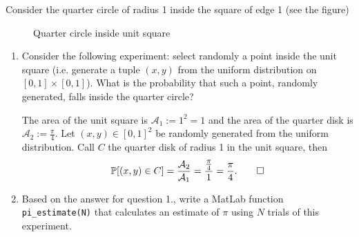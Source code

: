 \documentclass[fontsize=12pt, usenames, dvipsnames, headinclude, headsepline, footinclude, footsepline]{scrartcl}
\title{\normalfont{\bfseries{Probabilistic Algorithms: Homework 1}}}
\author{Laurent \textsc{Hayez}}
\date{\today}
\renewcommand{\P}{\mathbb{P}}
\begin{document}
\renewcommand{\labelitemi}{\textbullet}



\maketitle




\begin{exo}
  Consider the quarter circle of radius 1 inside the square of edge 1 (see the figure)
  \begin{figure}[h]
    \centering
    \caption{Quarter circle inside unit square}
    \label{fig:1}
  \end{figure}
  
  \begin{enumerate}
  \item Consider the following experiment: select randomly a point inside the unit square (i.e. generate a
    tuple $(x,y)$ from the uniform distribution on $[0, 1] \times [0, 1]$). What is the probability that such a point,
    randomly generated, falls inside the quarter circle?
    
    \begin{sol}
      The area of the unit square is $\mathcal{A}_1 := 1^2 = 1$ and the area of the quarter disk is
      $\mathcal{A}_2 := \frac{\pi}{4}$. Let $(x,y) \in [0,1]^2$ be randomly generated from the uniform
      distribution. Call $C$ the quarter disk of radius 1 in the unit square, then
      \[ \P[(x,y) \in C] = \frac{\mathcal{A}_2}{\mathcal{A}_1} = \frac{\frac{\pi}{4}}{1} = \frac{\pi}{4}. \qedhere\] 
    \end{sol}

    
  \item Based on the answer for question 1., write a MatLab function \texttt{pi\_estimate(N)} that calculates an
    estimate of $\pi$ using $N$ trials of this experiment.

    \begin{sol}\hfill\\
      
    \end{sol}


\end{enumerate}
\end{exo}
\end{document}
